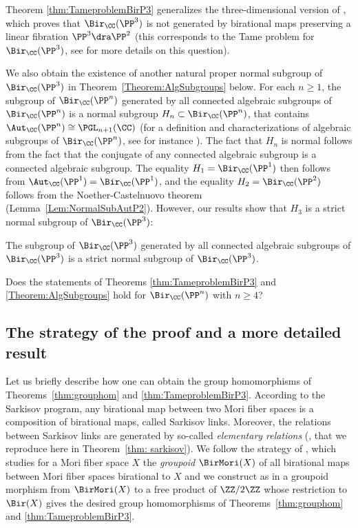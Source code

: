 Theorem \ref{thm:TameproblemBirP3} generalizes the three-dimensional version of \cite[Th.\,C]{BLZ}, which proves that $\Bir_\CC(\PP^3)$ is not generated by birational maps preserving a linear fibration $\PP^3\dra \PP^2$ (this corresponds to the Tame problem for $\Bir_\CC(\PP^3)$, see \cite[\S 1.C]{BLZ} for more details on this question).

We also obtain the existence of another natural proper normal subgroup of $\Bir_{\CC}(\PP^3)$ in Theorem~\ref{Theorem:AlgSubgroups} below. For each $n\ge 1$, the subgroup of $\Bir_{\CC}(\PP^n)$ generated by all connected algebraic subgroups of $\Bir_\CC(\PP^n)$ is a normal subgroup $H_n\subset \Bir_{\CC}(\PP^n)$, that contains $\Aut_{\CC}(\PP^n)\cong\PGL_{n+1}(\CC)$ (for a definition and characterizations of alge\-braic subgroups of $\Bir_{\CC}(\PP^n)$, see for instance \cite{BF13}). The fact that $H_n$ is normal follows from the fact that the conjugate of any connected algebraic subgroup is a connected algebraic subgroup. The equality $H_1=\Bir_{\CC}(\PP^1)$ then follows from $\Aut_{\CC}(\PP^1)=\Bir_{\CC}(\PP^1)$, and the equality $H_2=\Bir_{\CC}(\PP^2)$ follows from the Noether-Castelnuovo theorem (Lemma~\ref{Lem:NormalSubAutP2}). However, our results show that $H_3$ is a strict normal subgroup of $\Bir_{\CC}(\PP^3)$:\enlargethispage{\baselineskip}%

\begin{maintheorem}\label{Theorem:AlgSubgroups}
The subgroup of $\Bir_{\CC}(\PP^3)$ generated by all connected algebraic subgroups of $\Bir_\CC(\PP^3)$ is a strict normal subgroup of $\Bir_{\CC}(\PP^3)$.
\end{maintheorem}

\begin{question}
Does the statements of Theorems \ref{thm:TameproblemBirP3} and \ref{Theorem:AlgSubgroups} hold for $\Bir_\CC(\PP^n)$ with $n\geqslant 4$?
\end{question}

\subsection{The strategy of the proof and a more detailed result}
Let us briefly describe how one can obtain the group homomorphisms of Theorems~\ref{thm:grouphom} and \ref{thm:TameproblemBirP3}. According to the Sarkisov program, any birational map between two Mori fiber spaces is a composition of birational maps, called Sarkisov links. Moreover, the relations between Sarkisov links are generated by so-called \emph{elementary relations} (\cite[Th.\,4.29]{BLZ}, that we reproduce here in Theorem~\ref{thm: sarkisov}). We follow the strategy of \cite{BLZ}, which studies for a Mori fiber space $X$ the \emph{groupoid} $\BirMori(X)$ of all birational maps between Mori fiber spaces birational to $X$ and we construct as in \cite{BLZ} a groupoid morphism from $\BirMori(X)$ to a free product of $\ZZ/2\ZZ$ whose restriction to $\Bir(X)$ gives the desired group homomorphisms of Theorems~\ref{thm:grouphom} and \ref{thm:TameproblemBirP3}.

